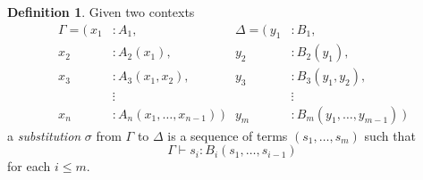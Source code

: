 \documentclass{article}
\theoremstyle{definition}
\newtheorem{definition}{Definition}[section]
\newcommand{\proves}{\vdash}
\begin{document}
\begin{definition}
    Given two contexts
    \begin{align*}
    \Gamma = \big(\ x_1 &: A_1,                             &\Delta = \big(\ y_1 &: B_1,\\
                    x_2 &: A_2(x_1),                        &                y_2 &: B_2(y_1),\\
                    x_3 &: A_3(x_1,x_2),                    &                y_3 &: B_3(y_1,y_2),\\
                    &\mathrel{\vdots}                       &                &\mathrel{\vdots}\\
                    x_n &: A_n(x_1,\ldots,x_{n-1})\ \big)   &                y_m &: B_m(y_1,\ldots,y_{m-1})\ \big)
    \end{align*}
    a \textit{substitution} $\sigma$ from $\Gamma$ to $\Delta$ is a sequence of terms $(s_1, \ldots, s_m)$ such that $$\Gamma \proves s_i : B_i(s_1,\ldots,s_{i-1})$$ for each $i \leq m$.
    
\end{definition}
\end{document}
